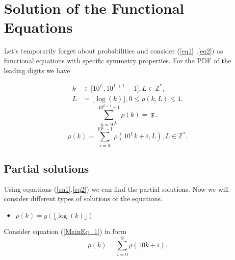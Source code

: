 \documentclass[titlepage,fleqn]{article}%
\providecommand{\U}[1]{\protect\rule{.1in}{.1in}}
\begin{document}
\appendix


\section{Solution of the Functional Equations}%

\label{SofFE}%


Let's temporarily forget about probabilities and consider (\ref{eq1}%
,\ref{eq2}$)$ as functional equations with specific symmetry properties. For
the PDF of the leading digits we have%

\begin{align*}
k  &  \in\lbrack10^{L},10^{L+1}-1],L\in%
\mathbb{Z}
^{\ast},\\
L  &  =\lfloor\log(k)\rfloor,0\leq\rho(k,L)\leq1.
\end{align*}%
\begin{equation}%
{\displaystyle\sum\limits_{k=10^{L}}^{10^{L+1}-1}}
\rho(k)=\digamma. \label{eq1}%
\end{equation}%
\begin{equation}
\rho(k)=%
{\displaystyle\sum\limits_{i=0}^{10^{L}-1}}
\rho(10^{L}k+i,L),L\in%
\mathbb{Z}
^{\ast}. \label{eq2}%
\end{equation}


\subsection{Partial solutions}%

\label{PartialSolutions}%
Using equations (\ref{eq1},\ref{eq2}) we can find the partial solutions. Now
we will consider different types of solutions of the equations.

\begin{itemize}
\item $\rho(k)=g(\lfloor\log(k)\rfloor)$
\end{itemize}

Consider equation (\ref{MainEq_1}) in form
\begin{equation}
\rho(k)=%
{\displaystyle\sum\limits_{i=0}^{9}}
\rho(10k+i). \label{X1}%
\end{equation}
\end{document}
